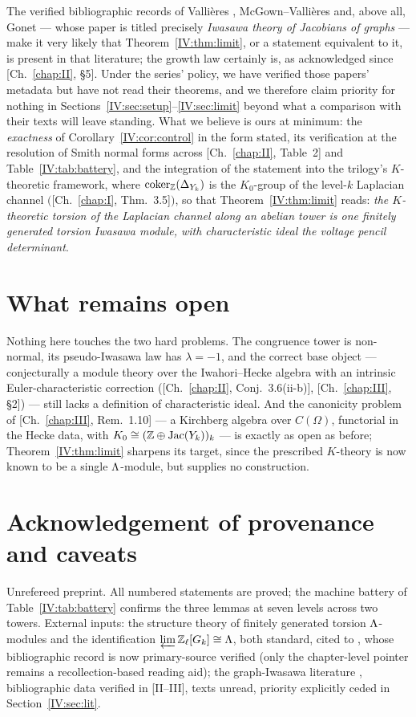 The verified bibliographic records of Vallières \cite{Vallieres}, McGown--Vallières
\cite{McGownVallieres} and, above all, Gonet --- whose paper is titled precisely
\emph{Iwasawa theory of Jacobians of graphs} \cite{Gonet} --- make it very likely
that Theorem~\ref{IV:thm:limit}, or a statement equivalent to it, is present in that
literature; the growth law certainly is, as acknowledged since [Ch.~\ref{chap:II}, \S5]. Under the
series' policy, we have verified those papers' metadata but have not read their
theorems, and we therefore claim priority for nothing in
Sections~\ref{IV:sec:setup}--\ref{IV:sec:limit} beyond what a comparison with their texts
will leave standing. What we believe is ours at minimum: the \emph{exactness} of
Corollary~\ref{IV:cor:control} in the form stated, its verification at the resolution
of Smith normal forms across [Ch.~\ref{chap:II}, Table~2] and Table~\ref{IV:tab:battery}, and the
integration of the statement into the trilogy's $K$-theoretic framework, where
$\operatorname{coker}_{\mathbb{Z}}(\Delta_{Y_k})$ is the $K_0$-group of the level-$k$ Laplacian channel
$($[Ch.~\ref{chap:I}, Thm.~3.5]$)$, so that Theorem~\ref{IV:thm:limit} reads: \emph{the
$K$-theoretic torsion of the Laplacian channel along an abelian tower is one
finitely generated torsion Iwasawa module, with characteristic ideal the voltage
pencil determinant}.

\section{What remains open}\label{IV:sec:open}

Nothing here touches the two hard problems. The congruence tower is non-normal, its
pseudo-Iwasawa law has $\lambda=-1$, and the correct base object --- conjecturally a
module theory over the Iwahori--Hecke algebra with an intrinsic Euler-characteristic
correction ([Ch.~\ref{chap:II}, Conj.~3.6(ii-b)], [Ch.~\ref{chap:III}, \S2]) --- still lacks a definition of
characteristic ideal. And the canonicity problem of [Ch.~\ref{chap:III}, Rem.~1.10] --- a Kirchberg
algebra over $C(\Omega)$, functorial in the Hecke data, with
$K_0\cong(\mathbb{Z}\oplus\operatorname{Jac}(Y_k))_k$ --- is exactly as open as before;
Theorem~\ref{IV:thm:limit} sharpens its target, since the prescribed $K$-theory is now
known to be a single $\Lambda$-module, but supplies no construction.

\section*{Acknowledgement of provenance and caveats}

Unrefereed preprint. All numbered statements are proved; the machine battery of
Table~\ref{IV:tab:battery} confirms the three lemmas at seven levels across two towers.
External inputs: the structure theory of finitely generated torsion
$\Lambda$-modules and the identification $\varprojlim\mathbb{Z}_\ell[G_k]\cong\Lambda$, both standard,
cited to \cite{Washington}, whose bibliographic record is now primary-source
verified (only the chapter-level pointer remains a recollection-based reading aid);
the graph-Iwasawa literature
\cite{Vallieres,McGownVallieres,Gonet}, bibliographic data verified in [II--III],
texts unread, priority explicitly ceded in Section~\ref{IV:sec:lit}.
